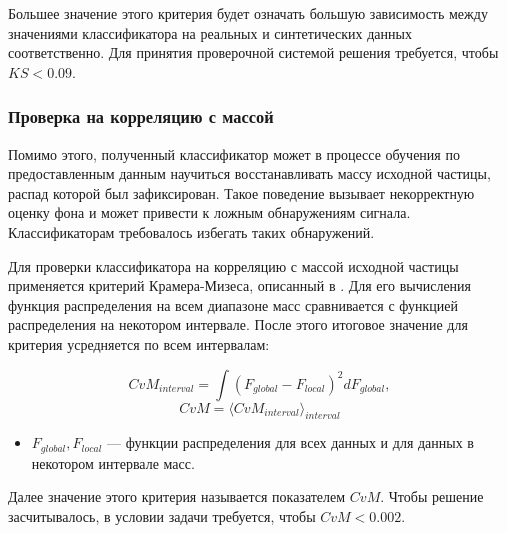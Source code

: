 \documentclass[14pt, a4paper]{extarticle}
\begin{document}
Большее значение этого критерия будет означать большую зависимость между значениями классификатора на реальных и синтетических данных соответственно.
Для принятия проверочной системой решения требуется, чтобы $KS < 0.09$.


\subsubsection*{Проверка на корреляцию с массой}
\label{mass_metrics}
Помимо этого, полученный классификатор может в процессе обучения по предоставленным данным научиться восстанавливать массу исходной частицы, распад которой был зафиксирован. Такое поведение вызывает некорректную оценку фона и может привести к ложным обнаружениям сигнала. Классификаторам требовалось избегать таких обнаружений.

Для проверки классификатора на корреляцию с массой исходной частицы применяется критерий Крамера-Мизеса, описанный в \cite{cramer}. Для его вычисления функция распределения на всем диапазоне масс сравнивается с функцией распределения на некотором интервале. После этого итоговое значение для критерия усредняется по всем интервалам:

\begin{equation*}
	CvM_{interval} = \int (F_{global} - F_{local})^2 dF_{global},
\end{equation*}
\begin{equation*}
	CvM = \langle CvM_{interval} \rangle_{interval}
\end{equation*}
\begin{itemize}
	\item $F_{global}, F_{local}$ — функции распределения для всех данных и для данных в некотором интервале масс.
\end{itemize}
Далее значение этого критерия называется показателем $CvM$. Чтобы решение засчитывалось, в условии задачи требуется, чтобы $CvM < 0.002$.
\end{document}
